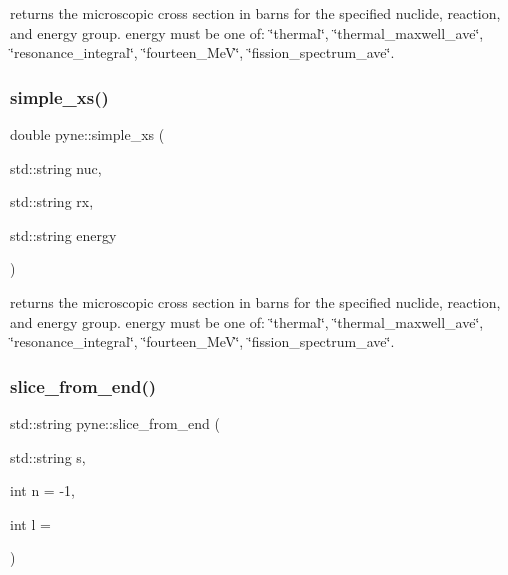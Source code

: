 returns the microscopic cross section in barns for the specified nuclide, reaction, and energy group. energy must be one of\+: \char`\"{}thermal\char`\"{}, \char`\"{}thermal\+\_\+maxwell\+\_\+ave\char`\"{}, \char`\"{}resonance\+\_\+integral\char`\"{}, \char`\"{}fourteen\+\_\+\+Me\+V\char`\"{}, \char`\"{}fission\+\_\+spectrum\+\_\+ave\char`\"{}. \mbox{\label{namespacepyne_ac9f173d7792a84eb558dc7396c7d4d56}} 
\subsubsection{\texorpdfstring{simple\+\_\+xs()}{simple\_xs()}\hspace{0.1cm}{\footnotesize\ttfamily [4/4]}}
{\footnotesize\ttfamily double pyne\+::simple\+\_\+xs (\begin{DoxyParamCaption}\item[{std\+::string}]{nuc,  }\item[{std\+::string}]{rx,  }\item[{std\+::string}]{energy }\end{DoxyParamCaption})}

returns the microscopic cross section in barns for the specified nuclide, reaction, and energy group. energy must be one of\+: \char`\"{}thermal\char`\"{}, \char`\"{}thermal\+\_\+maxwell\+\_\+ave\char`\"{}, \char`\"{}resonance\+\_\+integral\char`\"{}, \char`\"{}fourteen\+\_\+\+Me\+V\char`\"{}, \char`\"{}fission\+\_\+spectrum\+\_\+ave\char`\"{}. \mbox{\label{namespacepyne_abe1c85ef0d36e8e3eeb02076db773c88}} 
\subsubsection{\texorpdfstring{slice\+\_\+from\+\_\+end()}{slice\_from\_end()}}
{\footnotesize\ttfamily std\+::string pyne\+::slice\+\_\+from\+\_\+end (\begin{DoxyParamCaption}\item[{std\+::string}]{s,  }\item[{int}]{n = {\ttfamily -\/1},  }\item[{int}]{l = {} }\end{DoxyParamCaption})}

